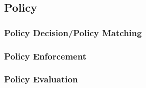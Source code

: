 \subsection{Policy}

\subsubsection{Policy Decision/Policy Matching}
\subsubsection{Policy Enforcement}
\subsubsection{Policy Evaluation}